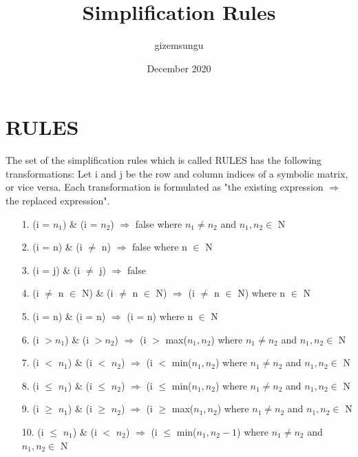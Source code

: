 \documentclass{article}
\title{Simplification Rules}
\author{gizemsungu }
\date{December 2020}
\begin{document}
\maketitle

\section{RULES}

The set of the simplification rules which is called RULES has the following transformations:
Let i and j be the row and column indices of a symbolic matrix, or vice versa. Each transformation is formulated as "the existing expression $\Rightarrow$ the replaced expression".
\begin{itemize}
	
	\item[1.] (i = $n_1$) \& (i = $n_2$) $\Rightarrow$ false where $n_1 \neq n_2$ and $n_1, n_2 \in$ N
	
	\item[2.] (i = n) \& (i $\neq$ n) $\Rightarrow$ false where n $\in$ N
	
	\item[3.] (i = j) \& (i $\neq$ j) $\Rightarrow$ false
	
	\item[4.] (i $\neq$ n $\in$ N) \& (i $\neq$ n $\in$ N) $\Rightarrow$ (i $\neq$ n $\in$ N) where n $\in$ N
	
	\item[5.] (i = n) \& (i = n) $\Rightarrow$ (i = n) where n $\in$ N
	
	\item[6.] (i $> n_1$) \& (i $> n_2$) $\Rightarrow$ (i $>$ max($n_1, n_2$) where $n_1 \neq n_2$ and $n_1, n_2 \in$ N
	
	\item[7.] (i $<$ $n_1$) \& (i $<$ $n_2$) $\Rightarrow$ (i $<$ min($n_1, n_2$) where $n_1 \neq n_2$ and $n_1, n_2 \in$ N
	
	
	\item[8.] (i $\leq$ $n_1$) \& (i $\leq$ $n_2$) $\Rightarrow$ (i $\leq$ min($n_1, n_2$) where $n_1 \neq n_2$ and $n_1, n_2 \in$ N
	
	\item[9.] (i $\geq$ $n_1$) \& (i $\geq$ $n_2$) $\Rightarrow$ (i $\geq$ max($n_1, n_2$) where $n_1 \neq n_2$ and $n_1, n_2 \in$ N
	
	
	\item[10.] (i $\leq$ $n_1$) \& (i $<$ $n_2$) $\Rightarrow$ (i $\leq$ min($n_1, n_2-1$) where $n_1 \neq n_2$ and $n_1, n_2 \in$ N
	

\end{itemize}
\end{document}
